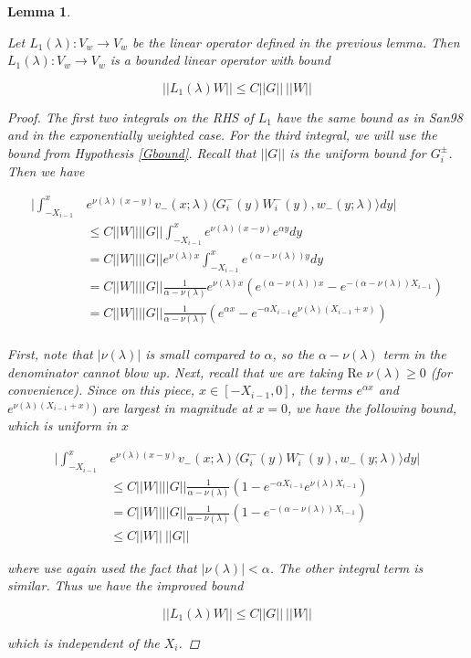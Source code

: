 \documentclass[12pt]{article}
\newtheorem{lemma}{Lemma}
\begin{document}
\begin{lemma}\label{L1better}

Let $L_1(\lambda): V_w \rightarrow V_w$ be the linear operator defined in the previous lemma. Then $L_1(\lambda): V_w \rightarrow V_w$ is a bounded linear operator with bound

\begin{equation}\label{L1bound}
||L_1(\lambda)W|| \leq C ||G|| \: ||W||
\end{equation}

\begin{proof}
The first two integrals on the RHS of $L_1$ have the same bound as in San98 and in the exponentially weighted case. For the third integral, we will use the bound from Hypothesis \ref{Gbound}. Recall that $||G||$ is the uniform bound for $G_i^\pm$. Then we have

\begin{align*}
\Big| \int_{-X_{i-1}}^x &e^{\nu(\lambda)(x-y)} v_-(x; \lambda) \langle G_i^-(y)W_i^-(y), w_-(y; \lambda) \rangle dy \Big| \\
&\leq C ||W|| ||G|| \int_{-X_{i-1}}^x e^{\nu(\lambda)(x-y)} e^{\alpha y} dy \\
&= C ||W|| ||G|| e^{\nu(\lambda)x }\int_{-X_{i-1}}^x e^{(\alpha - \nu(\lambda)) y} dy \\
&= C ||W|| ||G|| \frac{1}{\alpha - \nu(\lambda)} e^{\nu(\lambda)x } ( e^{(\alpha - \nu(\lambda)) x} - e^{-(\alpha - \nu(\lambda)) X_{i-1}}) \\
&= C ||W|| ||G|| \frac{1}{\alpha - \nu(\lambda)} ( e^{\alpha x} - e^{-\alpha X_{i-1}} e^{\nu(\lambda)(X_{i-1} + x)}) \\
\end{align*}

First, note that $|\nu(\lambda)|$ is small compared to $\alpha$, so the $\alpha - \nu(\lambda)$ term in the denominator cannot blow up. Next, recall that we are taking $\text{Re }\nu(\lambda) \geq 0$ (for convenience). Since on this piece, $x \in [-X_{i-1}, 0]$, the terms $e^{\alpha x}$ and $e^{\nu(\lambda)(X_{i-1} + x)})$ are largest in magnitude at $x = 0$, we have the following bound, which is uniform in $x$

\begin{align*}
\Big| \int_{-X_{i-1}}^x &e^{\nu(\lambda)(x-y)} v_-(x; \lambda) \langle G_i^-(y)W_i^-(y), w_-(y; \lambda) \rangle dy \Big| \\
&\leq C ||W|| ||G|| \frac{1}{\alpha - \nu(\lambda)} (1 - e^{-\alpha X_{i-1}} e^{\nu(\lambda)X_{i-1}}) \\
&= C ||W|| ||G|| \frac{1}{\alpha - \nu(\lambda)} (1 - e^{-(\alpha - \nu(\lambda)) X_{i-1}} ) \\ 
&\leq C ||W||\: ||G||
\end{align*}

where use again used the fact that $|\nu(\lambda)| < \alpha$. The other integral term is similar. Thus we have the improved bound

\[
||L_1(\lambda)W|| \leq C ||G|| \: ||W||
\]

which is independent of the $X_i$.

\end{proof}
\end{lemma}
\end{document}
